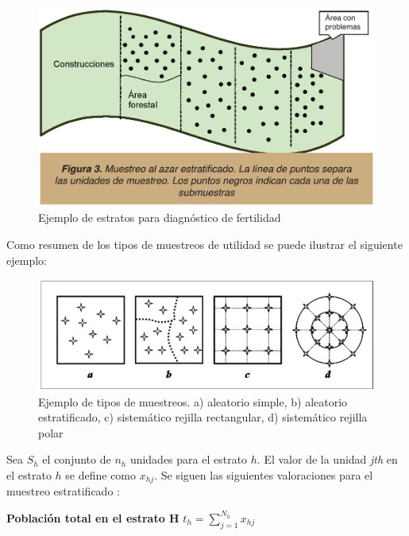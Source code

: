 \documentclass{report}
\begin{document}
\begin{figure}[H]
    \centering
    \includegraphics[width=0.5\paperwidth]{ref/stratified-sampling-examples.png}
    \caption{Ejemplo de estratos para diagnóstico de fertilidad \cite{lassaga-2011}}
\end{figure}

Como resumen de los tipos de muestreos de utilidad se puede ilustrar el siguiente ejemplo:

\begin{figure}[H]
    \centering
    \includegraphics[width=0.5\paperwidth]{ref/kind-of-samplings-example.png}
    \caption{Ejemplo de tipos de muestreos. a) aleatorio simple, b) aleatorio estratificado, c) sistemático rejilla rectangular, d) sistemático rejilla polar \cite{unknown-author-2007}}
\end{figure}

Sea $S_h$ el conjunto de $n_h$ unidades para el estrato $h$. El valor de la unidad \textit{jth} en el estrato $h$ se define como $x_{hj}$. Se siguen las siguientes valoraciones para el muestreo estratificado \cite{lohr-2009}:

\bigbreak

\textbf{Población total en el estrato H}
\bigbreak
$t_h = \sum_{j=1}^{N_h} x_{hj}$


\bigbreak
\end{document}
